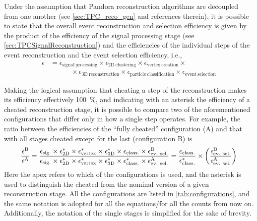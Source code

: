 Under the assumption that Pandora reconstruction algorithms are decoupled from one another (see \autoref{sec:TPC_reco_gen} and references therein), it is possible to state that the overall event reconstruction and selection efficiency is given by the product of the efficiency of the signal processing stage (see \autoref{sec:TPCSignalReconstruction}) and the efficiencies of the individual steps of the event reconstruction and the event selection efficiency, i.e., \begin{equation}
    \begin{aligned}
        \epsilon &= 
        \epsilon_\mathrm{signal\ processing} \times 
        \epsilon_\mathrm{2D\ clustering} \times 
        \epsilon_\mathrm{vertex\ creation} \times \\
        &\quad\quad\quad\times
        \epsilon_\mathrm{3D\ reconstruction} \times 
        \epsilon_\mathrm{particle\ classification} \times 
        \epsilon_\mathrm{event\ selection}
    \end{aligned}\label{eq:componentsEfficiency}
\end{equation} 

Making the logical assumption that cheating a step of the reconstruction makes its efficiency effectively \SI{100}{\percent}, and indicating with an asterisk the efficiency of a cheated reconstruction stage, it is possible to compare two of the aforementioned configurations that differ only  in how a single step operates. For example, the ratio between the efficiencies of the ``fully cheated'' configuration (A) and that with all stages cheated except for the last (configuration B) is \begin{equation}
    \frac{
    \epsilon^\mathrm{B}
    }{
    \epsilon^\mathrm{A}
    } = \frac{
    \epsilon_\mathrm{sig.} \times 
    \epsilon_\mathrm{2D}^* \times 
    \epsilon_\mathrm{vertex}^* \times 
    \epsilon_\mathrm{3D}^* \times 
    \epsilon_\mathrm{class.} \times 
    \epsilon_\mathrm{ev.\ sel.}^\mathrm{B}
    }{
    \epsilon_\mathrm{sig.} \times 
    \epsilon_\mathrm{2D}^* \times 
    \epsilon_\mathrm{vertex}^* \times 
    \epsilon_\mathrm{3D}^* \times 
    \epsilon_\mathrm{class.}^* \times 
    \epsilon_\mathrm{ev.\ sel.}^\mathrm{A}
    } = \frac{
    \epsilon_\mathrm{class.}
    }{
    \epsilon_\mathrm{class.}^*
    } \times \qty(\frac{
    \epsilon_\mathrm{ev.\ sel.}^\mathrm{B}
    }{
    \epsilon_\mathrm{ev.\ sel.}^\mathrm{A}
    }) \label{eq:methodBase}
\end{equation} Here the apex refers to which of the configurations is used, and the asterisk is used to distinguish the cheated from the nominal version of a given reconstruction stage. All the configurations are listed in \autoref{tab:configurations}, and the same notation is adopted for all the equations/for all the counts from now on. Additionally, the notation of the single stages is simplified for the sake of brevity. 

